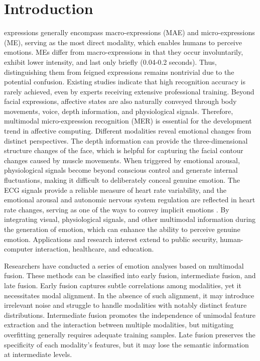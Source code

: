 \documentclass[lettersize,journal]{IEEEtran}
\begin{document}
\section{Introduction}
 expressions generally encompass macro-expressions (MAE) and micro-expressions (ME), serving as the most direct modality, which enables humans to perceive emotions. MEs differ from macro-expressions\cite{1} in that they occur involuntarily, exhibit lower intensity, and last only briefly (0.04-0.2 seconds)\cite{2}. Thus, distinguishing them from feigned expressions remains nontrivial due to the potential confusion. Existing studies indicate that high recognition accuracy is rarely achieved, even by experts receiving extensive professional training. Beyond facial expressions, affective states are also naturally conveyed through body movements, voice, depth information, and physiological signals. Therefore, multimodal micro-expression recognition (MER) is essential for the development trend in affective computing. Different modalities reveal emotional changes from distinct perspectives. The depth information can provide the three-dimensional structure changes of the face, which is helpful for capturing the facial contour changes caused by muscle movements\cite{3}. When triggered by emotional arousal, physiological signals become beyond conscious control and generate internal fluctuations, making it difficult to deliberately conceal genuine emotion\cite{4}. The ECG signals provide a reliable measure of heart rate variability, and the emotional arousal and autonomic nervous system regulation are reflected in heart rate changes, serving as one of the ways to convey implicit emotions \cite{5,6}. By integrating visual, physiological signals, and other multimodal information during the generation of emotion, which can enhance the ability to perceive genuine emotion\cite{7}. Applications and research interest extend to public security\cite{8}, human-computer interaction\cite{9}, healthcare\cite{10}, and education\cite{11}. 

Researchers have conducted a series of emotion analyses based on multimodal fusion. These methods can be classified into early fusion\cite{12}, intermediate fusion\cite{13}, and late fusion\cite{14,15}. Early fusion captures subtle correlations among modalities, yet it necessitates modal alignment. In the absence of such alignment, it may introduce irrelevant noise and struggle to handle modalities with notably distinct feature distributions. Intermediate fusion promotes the independence of unimodal feature extraction and the interaction between multiple modalities, but mitigating overfitting generally requires adequate training samples. Late fusion preserves the specificity of each modality's features, but it may lose the semantic information at intermediate levels.
\end{document}
